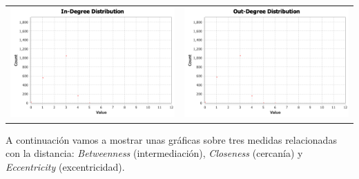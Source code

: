 \documentclass[11pt]{article}
\begin{document}
\begin{table}[H]
	\centering
	\begin{tabular}{cc}
		\includegraphics[scale=0.35]{images/2_1_indegree-distribution.png} & \includegraphics[scale=0.35]{images/2_1_outdegree-distribution.png}
	\end{tabular}
\end{table}

A continuación vamos a mostrar unas gráficas sobre tres medidas relacionadas con la distancia: \textit{Betweenness} (intermediación), \textit{Closeness} (cercanía) y \textit{Eccentricity} (excentricidad).
\end{document}
